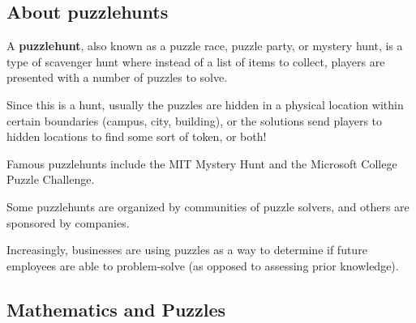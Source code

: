 \documentclass{beamer}
\theoremstyle{theorem}
\theoremstyle{definition}
\newcommand{\<}{\langle}
\renewcommand{\>}{\rangle}
\newcommand{\vpause}{\pause\vspace{1em}}
\begin{document}
\subsection{About puzzlehunts}

\begin{frame}
  A \textbf{puzzlehunt}, also known as a puzzle race,
  puzzle party, or mystery hunt, is a type of scavenger hunt where instead
  of a list of items to collect, players
  are presented with a number of puzzles to solve.

  \vpause

  Since this is a hunt, usually the puzzles are hidden in a physical
  location within certain boundaries (campus, city, building), or the
  solutions send players to hidden locations to find some sort of token,
  or both!
\end{frame}

\begin{frame}
  Famous puzzlehunts include the MIT Mystery Hunt and the
  Microsoft College Puzzle Challenge.

  \vpause

  Some puzzlehunts are organized by communities of puzzle solvers,
  and others are sponsored by companies.

  \vpause

  Increasingly, businesses are using puzzles as a way to determine if
  future employees are able to problem-solve (as opposed to assessing
  prior knowledge).
\end{frame}

\subsection{Mathematics and Puzzles}
\end{document}
